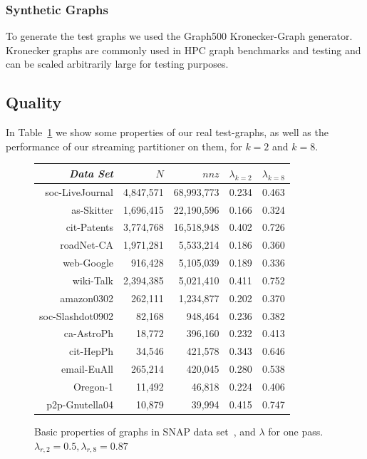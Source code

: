 
\subsubsection{Synthetic Graphs}
To generate the test graphs we used the Graph500 Kronecker-Graph generator.
Kronecker graphs are commonly used in HPC graph benchmarks and testing and can be scaled arbitrarily large for testing purposes. 



\subsection{Quality}
In Table~\ref{table:big} we show some properties of our real test-graphs, as well as the performance of our streaming partitioner on them, for $k=2$ and $k=8$.


\begin{figure}
\caption{Basic properties of graphs in SNAP data set~\cite{Leskovec-data}, and $\lambda$ for one pass. $\lambda_{r,2}=0.5,\lambda_{r,8}=0.87$}
\centering
\small
{ \begin{tabular}{ *5r }    \toprule
\label{table:big}
\emph{Data Set} & $N$ & $nnz$  & $\lambda_{k=2}$ & $\lambda_{k=8}$ \\\midrule
soc-LiveJournal & 4,847,571 & 68,993,773  &0.234& 0.463\\
as-Skitter & 1,696,415 & 22,190,596  & 0.166&0.324\\
cit-Patents & 3,774,768 & 16,518,948  & 0.402&0.726\\
roadNet-CA & 1,971,281 & 5,533,214  & 0.186&0.360\\
web-Google & 916,428 & 5,105,039  &0.189&0.336\\
wiki-Talk & 2,394,385 & 5,021,410 &0.411&0.752\\
amazon0302 & 262,111 & 1,234,877 & 0.202&0.370\\
soc-Slashdot0902 & 82,168 & 948,464  &0.236&0.382\\
ca-AstroPh & 18,772 & 396,160 & 0.232&0.413\\
cit-HepPh & 34,546 & 421,578 & 0.343&0.646\\
email-EuAll & 265,214 & 420,045 & 0.280&0.538\\
Oregon-1 & 11,492 & 46,818  & 0.224&0.406\\
p2p-Gnutella04 & 10,879 & 39,994  & 0.415&0.747\\
 \hline
\end{tabular}\par
}
\end{figure}



